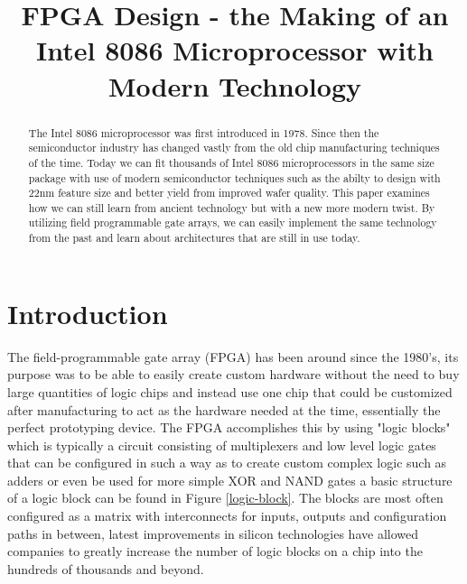 \documentclass[conference]{IEEEtran}
\begin{document}
\title{FPGA Design - the Making of an Intel 8086 Microprocessor with Modern Technology}

\maketitle


\begin{abstract}
The Intel 8086 microprocessor was first introduced in 1978. Since then the semiconductor industry has changed vastly from the old chip manufacturing techniques of the time. Today we can fit thousands of Intel 8086 microprocessors in the same size package with use of modern semiconductor techniques such as the abilty to design with 22nm feature size and better yield from improved wafer quality. This paper examines how we can still learn from ancient technology but with a new more modern twist. By utilizing field programmable gate arrays, we can easily implement the same technology from the past and learn about architectures that are still in use today.
\end{abstract}

%
\IEEEpeerreviewmaketitle



\section{Introduction}
The field-programmable gate array (FPGA) has been around since the 1980's, its purpose was to be able to easily create custom hardware without the need to buy large quantities of logic chips and instead use one chip that could be customized after manufacturing to act as the hardware needed at the time, essentially the perfect prototyping device. The FPGA accomplishes this by using "logic blocks" which is typically a circuit consisting of multiplexers and low level logic gates that can be configured in such a way as to create custom complex logic such as adders or even be used for more simple XOR and NAND gates a basic structure of a logic block can be found in Figure \ref{logic-block}. The blocks are most often configured as a matrix with interconnects for inputs, outputs and configuration paths in between, latest improvements in silicon technologies have allowed companies to greatly increase the number of logic blocks on a chip into the hundreds of thousands and beyond.
\end{document}
